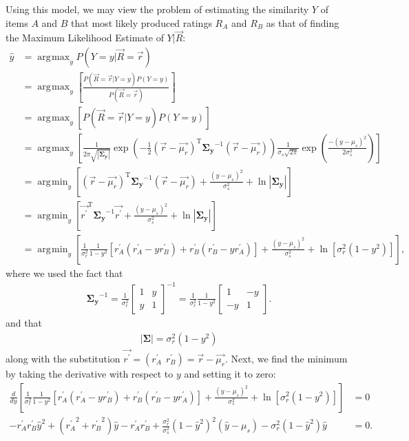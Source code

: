 \documentclass[11pt]{article}
\DeclareMathOperator*{\argmax}{arg\!\max}
\DeclareMathOperator*{\argmin}{arg\!\min}
\begin{document}
Using this model, we may view the problem of estimating the similarity $Y$ of
items $A$ and $B$ that most likely produced ratings $R_A$ and $R_B$ as
that of finding the Maximum Likelihood Estimate of $Y | \vec{R}$:
\begin{align}
\hat{y} &= \argmax_yP(Y=y|\vec{R}=\vec{r}) 
\\&= \argmax_y\left[\frac{P(\vec{R}=\vec{r} |
Y=y)P(Y=y)}{P(\vec{R}=\vec{r})}\right]
\\&= \argmax_y\left[P(\vec{R}=\vec{r}|Y=y)P(Y=y)\right]
\\&=
\argmax_y\left[\frac{1}{2\pi\sqrt{\left|\mathbf{\Sigma_y}\right|}}\exp{\left(-\frac{1}{2}
(\vec{r} - \vec{\mu_r})^\mathrm{T}\mathbf{\Sigma_y}^{-1}(\vec{r} - \vec{\mu_r})\right)}
\frac{1}{\sigma_{s}\sqrt{2\pi}}\exp{\left(\frac{-(y-\mu_s)^2}
{2\sigma_{s}^2}\right)}\right]
\\&= \argmin_y\left[(\vec{r} -
\vec{\mu_r})^\mathrm{T}\mathbf{\Sigma_y}^{-1}(\vec{r} - \vec{\mu_r}) + \frac{(y -
\mu_s)^2}{\sigma_{s}^2} + \ln{\left|\mathbf{\Sigma_y}\right|} \right]
\\&=
\argmin_y\left[\vec{r^\prime}^\mathrm{T}\mathbf{\Sigma_y}^{-1}\vec{r^\prime}
 + \frac{(y - \mu_s)^2}{\sigma_{s}^2} + \ln{\left|\mathbf{\Sigma_y}\right|} \right]
\\&= \argmin_y\left[\frac{1}{\sigma_r^2}\frac{1}{1 -
y^2}\left[r_A^\prime(r_A^\prime - yr_B^\prime) + r_B^\prime(r_B^\prime -
yr_A^\prime)\right] + \frac{(y - \mu_s)^2}{\sigma_{s}^2} +
\ln{\left[\sigma_r^2(1 - y^2)\right]} \right],
\end{align}
where we used the fact that
\begin{align}
\mathbf{\Sigma_y}^{-1} = \frac{1}{\sigma_r^2}
\left[ \begin{array}{cc}  1 & y \\ y & 1 \end{array} \right]^{-1} =
\frac{1}{\sigma_r^2}\frac{1}{1 - y^2}\left[ \begin{array}{cc}  1 & -y \\ -y & 1
\end{array} \right].
\end{align}
and that
\begin{align}
\left|\mathbf{\Sigma}\right| = \sigma_r^2(1 - y^2)
\end{align}
along with the substitution $\vec{r^\prime} = (r_A^\prime~~r_B^\prime) = \vec{r}
- \vec{\mu_r}$. Next, we find the minimum by taking the derivative with respect
to $y$ and setting it to zero:
\begin{align}
\frac{d}{dy}\left[ \frac{1}{\sigma_r^2}\frac{1}{1 -
y^2}\left[r_A^\prime(r_A^\prime - yr_B^\prime) + r_B^\prime(r_B^\prime -
yr_A^\prime)\right] + \frac{(y - \mu_s)^2}{\sigma_{s}^2} +
\ln{\left[\sigma_r^2(1 - y^2)\right]} \right] &= 0 \\\label{eqn:estimator}
-r_A^\prime r_B^\prime \hat{y}^2 + ({r_A^\prime}^2 + {r_B^\prime}^2)\hat{y} - r_A^\prime
r_B^\prime + \frac{\sigma_r^2}{\sigma_s^2}(1 - \hat{y}^2)^2(\hat{y} - \mu_s) - \sigma_r^2(1
- \hat{y}^2)\hat{y} &= 0.
\end{align}
\end{document}
